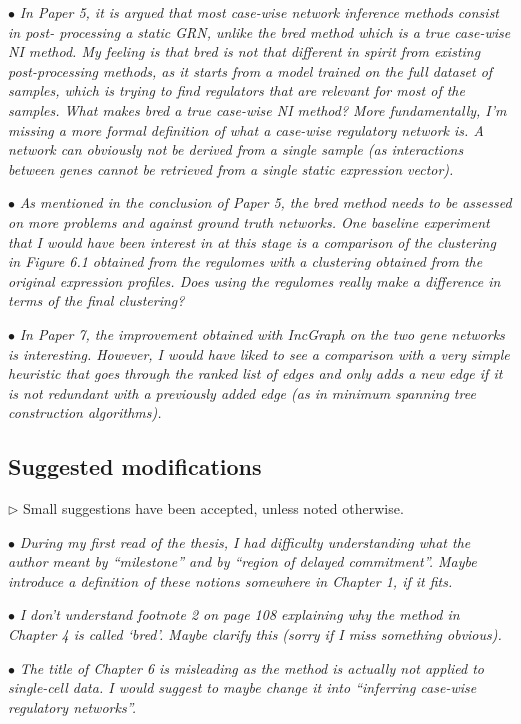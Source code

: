 \documentclass[10pt]{article}
\newcommand{\exam}[2][\  ]{\hspace{0pt}\marginpar{\color{red}#1}$\bullet$ \textit{#2}}
\newcommand{\imp}[1]{{\color{red} #1}}
\newcommand{\answ}[1]{{\color{blue} $\triangleright$ #1}}
\newcommand{\bigexclaim}{\raisebox{-0.1em}{\BigTriangleUp}\hspace{-0.32em}\llap{\small\textbf{!}}\hspace{0.32em}}
\newcommand{\tagimp}{\bigexclaim}
\newcommand{\tagtime}{{\Large $\hourglass$}}
\begin{document}
{\exam[\tagimp]{In Paper 5, it is argued that most case-wise network inference methods consist in post-
	processing a static GRN, unlike the bred method which is a true case-wise NI method. My
	feeling is that bred is not that different in spirit from existing post-processing methods, as it
	starts from a model trained on the full dataset of samples, which is trying to find regulators
	that are relevant for most of the samples. \imp{What makes bred a true case-wise NI method?}
	More fundamentally, \imp{I’m missing a more formal definition of what a case-wise regulatory
	network is.} A network can obviously not be derived from a single sample (as interactions
	between genes cannot be retrieved from a single static expression vector).}

\exam[\tagimp \tagtime]{As mentioned in the conclusion of Paper 5, the bred method needs to be assessed on more
	problems and against ground truth networks. One baseline experiment that I would have
	been interest in at this stage is \imp{a comparison of the clustering in Figure 6.1 obtained from
	the regulomes with a clustering obtained from the original expression profiles.} Does using
	the regulomes really make a difference in terms of the final clustering?}

\exam[\tagtime]{In Paper 7, the improvement obtained with IncGraph on the two gene networks is interesting.
	However, \imp{I would have liked to see a comparison with a very simple heuristic that goes
	through the ranked list of edges and only adds a new edge if it is not redundant with a
	previously added edge} (as in minimum spanning tree construction algorithms).}


\subsection{Suggested modifications}
\answ{Small suggestions have been accepted, unless noted otherwise.}

\exam{During my first read of the thesis, I had difficulty understanding what the author meant by
	“milestone” and by “region of delayed commitment”. Maybe introduce a definition of these
	notions somewhere in Chapter 1, if it fits.}

\exam{I don’t understand footnote 2 on page 108 explaining why the method in Chapter 4 is called
	‘bred’. Maybe clarify this (sorry if I miss something obvious).}

\exam{The title of Chapter 6 is misleading as the method is actually not applied to single-cell data.
	I would suggest to maybe change it into “inferring case-wise regulatory networks”.}

}
\end{document}
